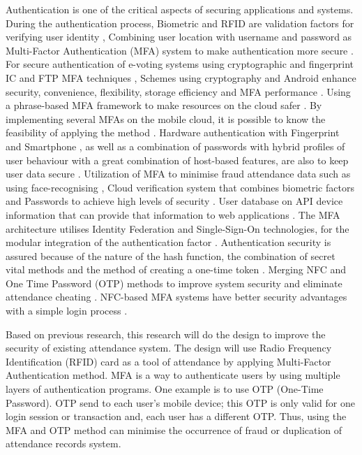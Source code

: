 Authentication is one of the critical aspects of securing applications and systems. During the authentication process, Biometric and RFID are validation factors for verifying user identity \cite{basilio2016multifactor}, Combining user location with username and password as Multi-Factor Authentication (MFA) system to make authentication more secure \cite{Ramatsakane2017}. For secure authentication of e-voting systems using cryptographic and fingerprint IC and FTP MFA techniques \cite{oke2017developing}, Schemes using cryptography and Android enhance security, convenience, flexibility, storage efficiency and MFA performance \cite{Venukumar2016}. Using a phrase-based MFA framework to make resources on the cloud safer \cite{rehman2016framework}. By implementing several MFAs on the mobile cloud, it is possible to know the feasibility of applying the method \cite{alizadeh2014feasibility}. Hardware authentication with Fingerprint and Smartphone \cite{ba2017addressing}, as well as a combination of passwords with hybrid profiles of user behaviour with a great combination of host-based features, are also to keep user data secure \cite{uluagac2014multi}. Utilization of MFA to minimise fraud attendance data such as using face-recognising \cite{sarker2016design}, Cloud verification system that combines biometric factors and Passwords to achieve high levels of security \cite{khan2015multi}. User database on API device information that can provide that information to web applications \cite{mandyam2015leveraging}. The MFA architecture utilises Identity Federation and Single-Sign-On technologies, for the modular integration of the authentication factor \cite{shah2015multi}. Authentication security is assured because of the nature of the hash function, the combination of secret vital methods and the method of creating a one-time token \cite{zhao2015asynchronous}. Merging NFC and One Time Password (OTP) methods to improve system security and eliminate attendance cheating \cite{jacob2015mobile}. NFC-based MFA systems have better security advantages with a simple login process \cite{hufstetler2017nfc}. 
\par Based on previous research, this research will do the design to improve the security of existing attendance system. The design will use Radio Frequency Identification (RFID) card as a tool of attendance by applying Multi-Factor Authentication method. MFA is a way to authenticate users by using multiple layers of authentication programs. One example is to use OTP (One-Time Password). OTP send to each user's mobile device; this OTP is only valid for one login session or transaction and, each user has a different OTP. Thus, using the MFA and OTP method can minimise the occurrence of fraud or duplication of attendance records system.

